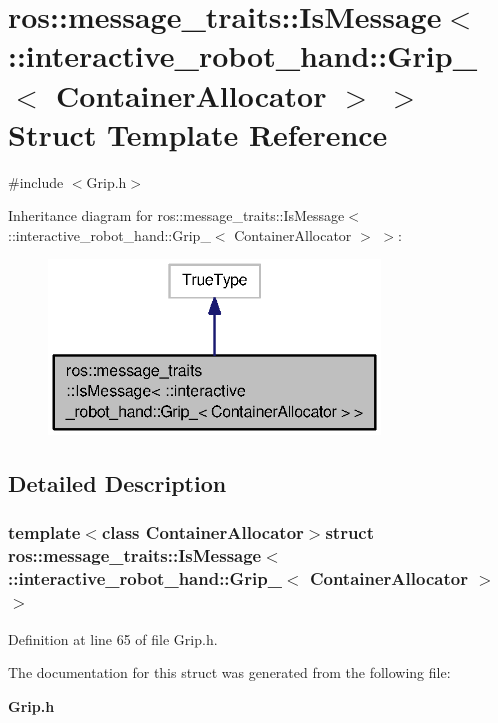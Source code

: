 \section{ros\-:\-:message\-\_\-traits\-:\-:Is\-Message$<$ \-:\-:interactive\-\_\-robot\-\_\-hand\-:\-:Grip\-\_\-$<$ Container\-Allocator $>$ $>$ Struct Template Reference}
\label{structros_1_1message__traits_1_1IsMessage_3_01_1_1interactive__robot__hand_1_1Grip___3_01ContainerAllocator_01_4_01_4}


{\ttfamily \#include $<$Grip.\-h$>$}



Inheritance diagram for ros\-:\-:message\-\_\-traits\-:\-:Is\-Message$<$ \-:\-:interactive\-\_\-robot\-\_\-hand\-:\-:Grip\-\_\-$<$ Container\-Allocator $>$ $>$\-:\nopagebreak
\begin{figure}[H]
\begin{center}
\leavevmode
\includegraphics[width=250pt]{structros_1_1message__traits_1_1IsMessage_3_01_1_1interactive__robot__hand_1_1Grip___3_01Contain218cdb0578a29afdbbca99841ab6f695}
\end{center}
\end{figure}


\subsection{Detailed Description}
\subsubsection*{template$<$class Container\-Allocator$>$struct ros\-::message\-\_\-traits\-::\-Is\-Message$<$ \-::interactive\-\_\-robot\-\_\-hand\-::\-Grip\-\_\-$<$ Container\-Allocator $>$ $>$}



Definition at line 65 of file Grip.\-h.



The documentation for this struct was generated from the following file\-:\begin{DoxyCompactItemize}
\item 
{\bf Grip.\-h}\end{DoxyCompactItemize}
